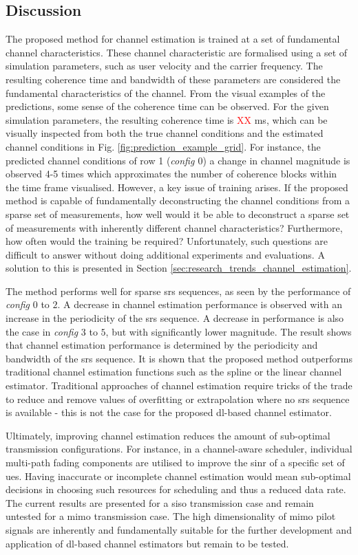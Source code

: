 \subsection{Discussion}
The proposed method for channel estimation is trained at a set of fundamental channel characteristics. These channel characteristic are formalised using a set of simulation parameters, such as user velocity and the carrier frequency. The resulting coherence time and bandwidth of these parameters are considered the fundamental characteristics of the channel. From the visual examples of the predictions, some sense of the coherence time can be observed. For the given simulation parameters, the resulting coherence time is \textcolor{red}{XX} ms, which can be visually inspected from both the true channel conditions and the estimated channel conditions in Fig. \ref{fig:prediction_example_grid}. For instance, the predicted channel conditions of row 1 (\emph{config $0$}) a change in channel magnitude is observed 4-5 times which approximates the number of coherence blocks within the time frame visualised. However, a key issue of training arises. If the proposed method is capable of fundamentally deconstructing the channel conditions from a sparse set of measurements, how well would it be able to deconstruct a sparse set of measurements with inherently different channel characteristics? Furthermore, how often would the training be required? Unfortunately, such questions are difficult to answer without doing additional experiments and evaluations. A solution to this is presented in Section \ref{sec:research_trends_channel_estimation}.

The method performs well for sparse \gls{srs} sequences, as seen by the performance of \emph{config} $0$ to $2$. A decrease in channel estimation performance is observed with an increase in the periodicity of the \gls{srs} sequence.  A decrease in performance is also the case in \emph{config} $3$ to $5$, but with significantly lower magnitude. The result shows that channel estimation performance is determined by the periodicity and bandwidth of the \gls{srs} sequence. It is shown that the proposed method outperforms traditional channel estimation functions such as the spline or the linear channel estimator. Traditional approaches of channel estimation require tricks of the trade to reduce and remove values of overfitting or extrapolation where no \gls{srs} sequence is available - this is not the case for the proposed \gls{dl}-based channel estimator.

Ultimately, improving channel estimation reduces the amount of sub-optimal transmission configurations. For instance, in a channel-aware scheduler, individual multi-path fading components are utilised to improve the \gls{sinr} of a specific set of \glspl{ue}. Having inaccurate or incomplete channel estimation would mean sub-optimal decisions in choosing such resources for scheduling and thus a reduced data rate. The current results are presented for a \gls{siso} transmission case and remain untested for a \gls{mimo} transmission case. The high dimensionality of \gls{mimo} pilot signals are inherently and fundamentally suitable for the further development and application of \gls{dl}-based channel estimators but remain to be tested. 

